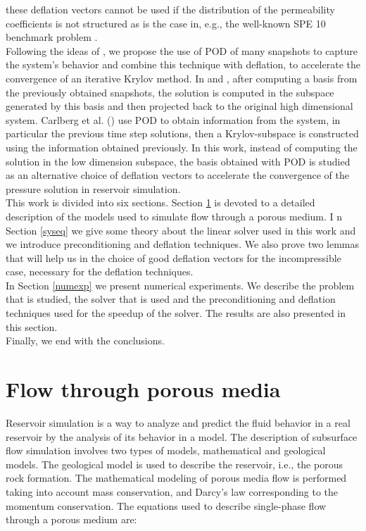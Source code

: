 \documentclass[12pt]{article}
\numberwithin{equation}{section}
\begin{document}
these deflation vectors cannot be used if the distribution of the permeability coefficients  is not 
structured as is the case in, e.g., the well-known SPE 10 benchmark problem \cite{Christie01}.\\
Following the ideas of \cite{Astrid11,Mark06,Pasetto16,Carlberg15}, we propose the use of POD of many snapshots 
to capture the system's behavior and combine this technique with deflation, to  accelerate the convergence of 
an iterative Krylov method. In \cite{Astrid11,Mark06} and \cite{Pasetto16}, after computing a basis from the 
previously obtained snapshots, the solution is computed in the subspace generated by this basis and then projected 
back to the original high dimensional system. Carlberg et al. (\cite{Carlberg15}) use POD to obtain information 
from the system, in particular the previous time step solutions, then a Krylov-subspace is constructed using the 
information obtained previously.
In this work, instead of computing the solution in the low dimension subspace, the basis obtained with POD is 
studied as an alternative choice of deflation vectors 
to accelerate the convergence of the pressure solution in reservoir simulation.  \\
This work is divided into six sections. 
  Section \ref{fpm} is devoted to a detailed description of the models used to simulate flow through a porous medium. I
  n Section \ref{syseq} we give some theory about the linear solver used in this work and we introduce preconditioning 
  and deflation techniques. We also prove two lemmas that will help us in the choice of good deflation vectors for the 
  incompressible case, necessary for the deflation techniques.\\
 In Section \ref{numexp} we present numerical experiments. We describe the problem that is studied, the solver that is 
 used and the preconditioning and deflation techniques used for the speedup of the solver. The results are also presented
 in this section. \\
 Finally, we end with the conclusions.
 
 
 \newpage
 \section{Flow through porous media}\label{fpm}
\hspace{0.5cm}Reservoir simulation is a way to analyze and predict the fluid behavior in a real reservoir
by the analysis of its behavior in a model. The description of subsurface flow simulation involves two types of models, 
mathematical and geological models. The geological model is used to describe the reservoir, i.e., the porous rock formation. 
The mathematical modeling of porous media flow is performed taking into account mass conservation, and Darcy's law
corresponding to the momentum conservation. The equations used to describe single-phase flow through a porous medium are:\\
\end{document}
